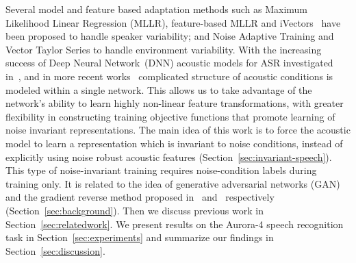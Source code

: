 \documentclass[a4paper]{article}
\begin{document}
    Several model and feature based adaptation methods such as Maximum 
    Likelihood Linear Regression (MLLR),  feature-based MLLR and 
    iVectors~\citep{saon2013speaker} have been proposed to handle speaker 
    variability; and Noise Adaptive Training \citep[NAT;][]{kalinli2010noise}
    and Vector Taylor Series \citep[VTS;][]{un1998speech} to handle 
    environment variability.
    With the increasing success of Deep Neural 
    Network~(DNN) acoustic models for ASR investigated 
    in~\citep{hinton2012deep,seide2011conversational,sainath2011making}, 
    and in more recent works~\citep{miao2015eesen,sainath2015learning} 
    complicated structure of acoustic conditions is modeled within a single network.
    This allows us to take 
    advantage of the network's ability to learn highly non-linear feature 
    transformations, with greater flexibility in constructing training 
    objective functions that promote learning of noise invariant 
    representations.
    The main idea of this work is to force the acoustic model 
    to learn a representation which is invariant to noise conditions, instead of 
    explicitly using noise robust acoustic features 
    (Section~\ref{sec:invariant-speech}). This type of noise-invariant 
    training requires noise-condition labels during training only. It is 
    related to the idea of generative adversarial networks (GAN) and the 
    gradient reverse method proposed in~\cite{goodfellow2014generative} 
    and~\cite{ganin2014unsupervised} respectively 
    (Section~\ref{sec:background}). Then we discuss previous work in 
    Section~\ref{sec:relatedwork}. 
    We present results on the Aurora-4 speech 
    recognition task in Section~\ref{sec:experiments} and summarize 
    our findings in Section~\ref{sec:discussion}.

\end{document}
